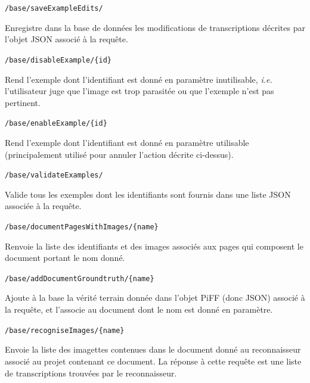 \begin{description}[align=left]
\item [POST] \texttt{/base/saveExampleEdits/}\newline{}
\begin{itshape}
Enregistre dans la base de données les modifications de transcriptions décrites par l'objet JSON associé à la requête.
\end{itshape}

\item [PUT] \texttt{/base/disableExample/\{id\}}\newline{}
\begin{itshape}
Rend l'exemple dont l'identifiant est donné en paramètre inutilisable, \textit{i.e.} l'utilisateur juge que l'image est trop parasitée ou que l'exemple n'est pas pertinent.
\end{itshape}

\item [PUT] \texttt{/base/enableExample/\{id\}}\newline{}
\begin{itshape}
Rend l'exemple dont l'identifiant est donné en paramètre utilisable (principalement utilisé pour annuler l'action décrite ci-dessus).
\end{itshape}

\item [POST] \texttt{/base/validateExamples/}\newline{}
\begin{itshape}
Valide tous les exemples dont les identifiants sont fournis dans une liste JSON associée à la requête.
\end{itshape}

\item [Découpe]

\item [GET] \texttt{/base/documentPagesWithImages/\{name\}}\newline{}
\begin{itshape}
Renvoie la liste des identifiants et des images associés aux pages qui composent le document portant le nom donné.
\end{itshape}

\item [POST] \texttt{/base/addDocumentGroundtruth/\{name\}}\newline{}
\begin{itshape}
Ajoute à la base la vérité terrain donnée dans l'objet PiFF (donc JSON) associé à la requête, et l'associe au document dont le nom est donné en paramètre.
\end{itshape}

\item [GET] \texttt{/base/recogniseImages/\{name\}}\newline{}
\begin{itshape}
Envoie la liste des imagettes contenues dans le document donné au reconnaisseur associé au projet contenant ce document. La réponse à cette requête est une liste de transcriptions trouvées par le reconnaisseur.
\end{itshape}

\end{description}

